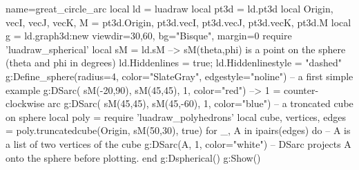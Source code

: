 \documentclass[border=5pt]{standalone}%
\begin{document}
\begin{luadraw}{name=great_circle_arc}
local ld = luadraw
local pt3d = ld.pt3d
local Origin, vecI, vecJ, vecK, M = pt3d.Origin, pt3d.vecI, pt3d.vecJ, pt3d.vecK, pt3d.M
local g = ld.graph3d:new{ viewdir={30,60}, bg="Bisque", margin=0 }
require 'luadraw_spherical'
local sM = ld.sM --> sM(theta,phi) is a point on the sphere (theta and phi in degrees)
ld.Hiddenlines = true; ld.Hiddenlinestyle = "dashed"
g:Define_sphere({radius=4, color="SlateGray", edgestyle="noline"})
-- a first simple example
g:DSarc( {sM(-20,90), sM(45,45)}, 1, {color="red"}) --> 1 = counter-clockwise arc
g:DSarc( {sM(45,45), sM(45,-60)}, 1, {color="blue"})
-- a troncated cube on sphere
local poly = require 'luadraw_polyhedrons'
local cube, vertices, edges = poly.truncatedcube(Origin, sM(50,30), true)
for _, A in ipairs(edges) do -- A is a list of two vertices of the cube
    g:DSarc(A, 1, {color="white"}) -- DSarc projects A onto the sphere before plotting.
end
g:Dspherical()
g:Show()
\end{luadraw}
\end{document}

